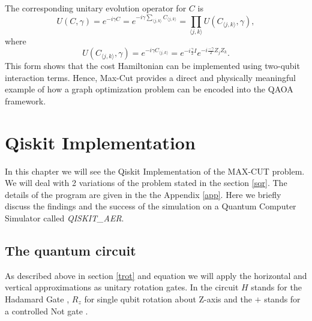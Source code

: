 \documentclass[english,12pt,a4paper]{report}
\begin{document}
	The corresponding unitary evolution operator for $C$ is
	\begin{equation}
		U(C,\gamma)= e^{-i\gamma C} = e^{-i\gamma \sum_{\langle j,k\rangle}C_{\langle j,k\rangle}}=\prod_{\langle j,k\rangle}U(C_{\langle j,k\rangle},\gamma),
	\end{equation}
	where
	\[
	U(C_{\langle j,k\rangle},\gamma) = e^{-i\gamma C_{\langle j,k\rangle}}=e^{-i\frac{\gamma}{2}I}e^{-i\frac{-\gamma}{2}Z_jZ_k}.
	\]
	This form shows that the cost Hamiltonian can be implemented using two-qubit interaction terms. Hence, Max-Cut provides a direct and physically meaningful example of how a graph optimization problem can be encoded into the QAOA framework.
	\chapter{Qiskit Implementation}
	\hspace{1.15em}In this chapter we will see the Qiskit Implementation of the MAX-CUT problem. We will deal with 2 variations of the problem stated in the section \ref{sqr}. The details of the program are given in the the Appendix \ref{app}. Here we briefly discuss the findings and the success of the simulation on a Quantum Computer Simulator called \emph{QISKIT\_AER}. 
	\section{The quantum circuit}
	\hspace{1.15em}As described above in section \ref{trot} and equation  we will apply the horizontal and vertical approximations as unitary rotation gates. In the circuit $H$ stands for the Hadamard Gate , $R_z$ for single qubit rotation about Z-axis and the $+$ stands for a controlled Not gate \cite{nielsen}.
	
\end{document}
